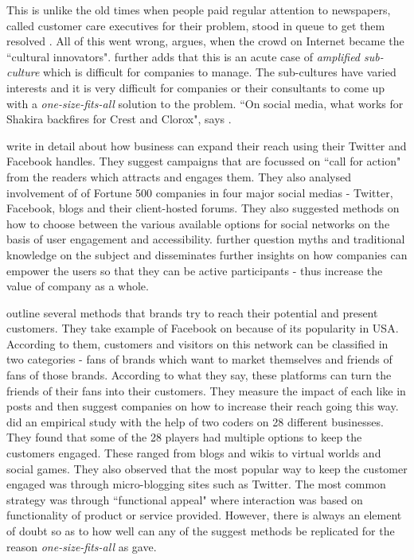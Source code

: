 \documentclass[12pt]{article}
\begin{document}
This is unlike the old times when people paid regular attention to newspapers, called customer care executives for their problem, stood in queue to get them resolved \citep{culnan2010}. All of this went wrong, \cite{holt2016} argues, when the crowd on Internet became the ``cultural innovators". \cite{holt2016} further adds that this is an acute case of \textit{amplified sub-culture} which is difficult for companies to manage. The sub-cultures have varied interests and it is very difficult for companies or their consultants to come up with a \textit{one-size-fits-all} solution to the problem. ``On social media, what works for Shakira backfires for Crest and Clorox", says \cite{holt2016}. 

\cite{culnan2010} write in detail about how business can expand their reach using their Twitter and Facebook handles. They suggest campaigns that are focussed on ``call for action" from the readers which attracts and engages them. They also analysed involvement of of Fortune 500 companies in four major social medias - Twitter, Facebook, blogs and their client-hosted forums. They also suggested methods on how to choose between the various available options for social networks on the basis of user engagement and accessibility. \cite{hanna2011} further question myths and traditional knowledge on the subject and disseminates further insights on how companies can empower the users so that they can be active participants - thus increase the value of company as a whole. 

\cite{lipsman2012} outline several methods that brands try to reach their potential and present customers. They take example of Facebook on because of its popularity in USA. According to them, customers and visitors on this network can be classified in two categories - fans of brands which want to market themselves and friends of fans of those brands. According to what they say, these platforms can turn the friends of their fans into their customers. They measure the impact of each like in posts and then suggest companies on how to increase their reach going this way. \cite{ashley2015} did an empirical study with the help of two coders on 28 different businesses. They found that some of the 28 players had multiple options to keep the customers engaged. These ranged from blogs and wikis to virtual worlds and social games. They also observed that the most popular way to keep the customer engaged was through micro-blogging sites such as Twitter. The most common strategy was through ``functional appeal" where interaction was based on functionality of product or service provided. However, there is always an element of doubt so as to how well can any of the suggest methods be replicated for the reason \textit{one-size-fits-all} as \cite{holt2016} gave.
\end{document}
